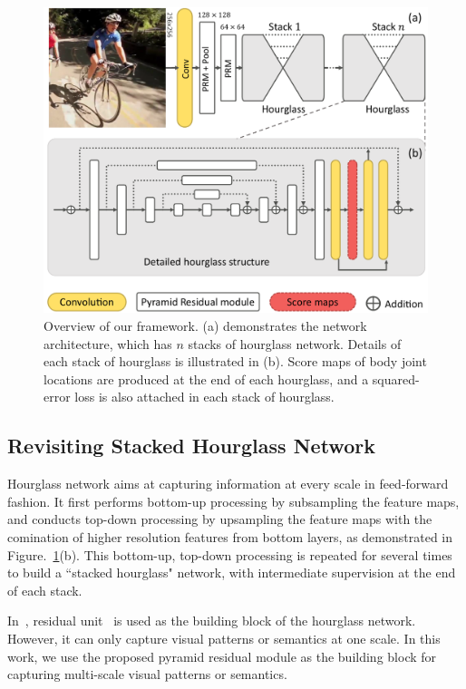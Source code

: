 \documentclass[10pt,twocolumn,letterpaper]{article}
\begin{document}
\begin{figure}%
	\begin{center}
		\includegraphics[width=1\linewidth]{figures/framework4.pdf}
	\end{center}
	\vspace{-0.5em}
	\caption{Overview of our framework. (a) demonstrates the network architecture, which has $n$ stacks of hourglass network. Details of each stack of hourglass is illustrated in (b). 
		Score maps of body joint locations are produced at the end of each hourglass, and a squared-error loss is also attached in each stack of hourglass.}
	\label{fig:framework}
	\vspace{-1em}
\end{figure}

\subsection{Revisiting Stacked Hourglass Network}
Hourglass network aims at capturing information at every scale in feed-forward fashion. It first performs bottom-up processing by subsampling the feature maps, and conducts top-down processing by upsampling the feature maps with the comination of higher resolution features from bottom layers, as demonstrated in Figure.~\ref{fig:framework}(b). 
This bottom-up, top-down processing is repeated for several times to build a ``stacked hourglass" network, with intermediate supervision at the end of each stack. 

In~\cite{newell2016stacked}, residual unit~\cite{he2016identity} is used as the building block of the hourglass network. 
However, it can only capture visual patterns or semantics at one scale. 
In this work, we use the proposed pyramid residual module as the building block for capturing multi-scale visual patterns or semantics. 
\end{document}
